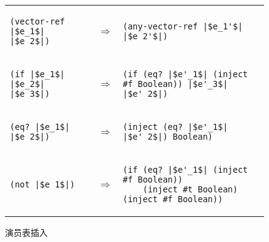 \documentclass[11pt]{book}
\begin{document}
\begin{figure}[btp]
\begin{tabular}{|lll|}
\begin{minipage}{0.65\textwidth}
\end{minipage}
\\[2ex]\hline
\begin{minipage}{0.27\textwidth}
\begin{lstlisting}
(vector-ref |$e_1$| |$e_2$|)
\end{lstlisting}
\end{minipage}
&
$\Rightarrow$
&
\begin{minipage}{0.65\textwidth}
\begin{lstlisting}
(any-vector-ref |$e_1'$| |$e_2'$|)
\end{lstlisting}
\end{minipage}
\\[2ex]\hline
\begin{minipage}{0.27\textwidth}
\begin{lstlisting}
(if |$e_1$| |$e_2$| |$e_3$|)
\end{lstlisting}
\end{minipage}
&
$\Rightarrow$
&
\begin{minipage}{0.65\textwidth}
\begin{lstlisting}
(if (eq? |$e'_1$| (inject #f Boolean)) |$e'_3$| |$e'_2$|)
\end{lstlisting}
\end{minipage}
\\[2ex]\hline
\begin{minipage}{0.27\textwidth}
\begin{lstlisting}
(eq? |$e_1$| |$e_2$|)
\end{lstlisting}
\end{minipage}
&
$\Rightarrow$
&
\begin{minipage}{0.65\textwidth}
\begin{lstlisting}
(inject (eq? |$e'_1$| |$e'_2$|) Boolean)
\end{lstlisting}
\end{minipage}
\\[2ex]\hline
\begin{minipage}{0.27\textwidth}
\begin{lstlisting}
(not |$e_1$|)
\end{lstlisting}
\end{minipage}
&
$\Rightarrow$
&
\begin{minipage}{0.65\textwidth}
\begin{lstlisting}
(if (eq? |$e'_1$| (inject #f Boolean))
    (inject #t Boolean) (inject #f Boolean))
\end{lstlisting}
\end{minipage}
\\[2ex]\hline
\end{tabular} 

\caption{演员表插入}
\label{fig:compile-r7-Rany}
\end{figure}
\end{document}
